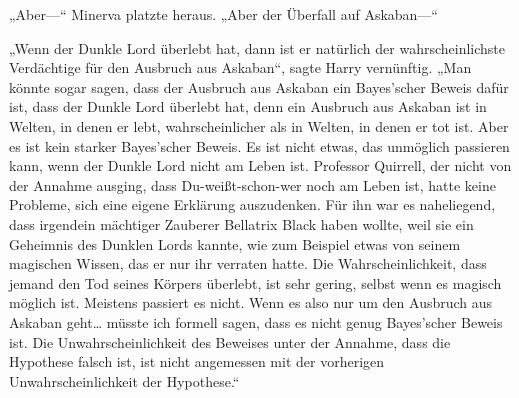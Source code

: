 „Aber—“ Minerva platzte heraus. „Aber der Überfall auf Askaban—“

„Wenn der Dunkle Lord überlebt hat, dann ist er natürlich der wahrscheinlichste Verdächtige für den Ausbruch aus Askaban“, sagte Harry vernünftig. „Man könnte sogar sagen, dass der Ausbruch aus Askaban ein Bayes’scher Beweis dafür ist, dass der Dunkle Lord überlebt hat, denn ein Ausbruch aus Askaban ist in Welten, in denen er lebt, wahrscheinlicher als in Welten, in denen er tot ist. Aber es ist kein starker Bayes’scher Beweis. Es ist nicht etwas, das unmöglich passieren kann, wenn der Dunkle Lord nicht am Leben ist. Professor Quirrell, der nicht von der Annahme ausging, dass Du-weißt-schon-wer noch am Leben ist, hatte keine Probleme, sich eine eigene Erklärung auszudenken. Für ihn war es naheliegend, dass irgendein mächtiger Zauberer Bellatrix Black haben wollte, weil sie ein Geheimnis des Dunklen Lords kannte, wie zum Beispiel etwas von seinem magischen Wissen, das er nur ihr verraten hatte. Die Wahrscheinlichkeit, dass jemand den Tod seines Körpers überlebt, ist sehr gering, selbst wenn es magisch möglich ist. Meistens passiert es nicht. Wenn es also nur um den Ausbruch aus Askaban geht… müsste ich formell sagen, dass es nicht genug Bayes’scher Beweis ist. Die Unwahrscheinlichkeit des Beweises unter der Annahme, dass die Hypothese falsch ist, ist nicht angemessen mit der vorherigen Unwahrscheinlichkeit der Hypothese.“

